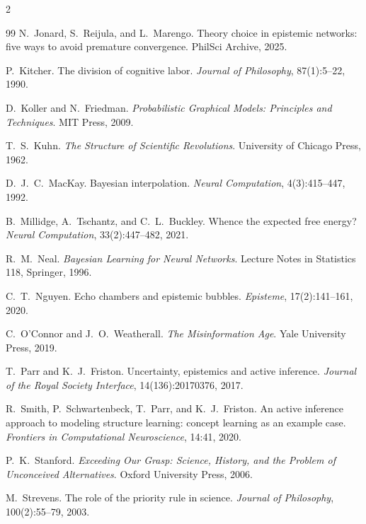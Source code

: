 \documentclass[11pt]{article}
\begin{document}
\begin{multicols}{2}
\begin{thebibliography}{99}
N.~Jonard, S.~Reijula, and L.~Marengo.
Theory choice in epistemic networks: five ways to avoid premature convergence. PhilSci Archive, 2025.

P.~Kitcher.
The division of cognitive labor. \emph{Journal of Philosophy}, 87(1):5--22, 1990.

D.~Koller and N.~Friedman.
\emph{Probabilistic Graphical Models: Principles and Techniques}. MIT Press, 2009.

T.~S.~Kuhn.
\emph{The Structure of Scientific Revolutions}. University of Chicago Press, 1962.

D.~J.~C.~MacKay.
Bayesian interpolation. \emph{Neural Computation}, 4(3):415--447, 1992.

B.~Millidge, A.~Tschantz, and C.~L.~Buckley.
Whence the expected free energy? \emph{Neural Computation}, 33(2):447--482, 2021.

R.~M.~Neal.
\emph{Bayesian Learning for Neural Networks}.
Lecture Notes in Statistics 118, Springer, 1996.

C.~T.~Nguyen.
Echo chambers and epistemic bubbles. \emph{Episteme}, 17(2):141--161, 2020.

C.~O'Connor and J.~O.~Weatherall.
\emph{The Misinformation Age}. Yale University Press, 2019.

T.~Parr and K.~J.~Friston.
Uncertainty, epistemics and active inference.
\emph{Journal of the Royal Society Interface}, 14(136):20170376, 2017.

R.~Smith, P.~Schwartenbeck, T.~Parr, and K.~J.~Friston.
An active inference approach to modeling structure learning: concept learning as an example case.
\emph{Frontiers in Computational Neuroscience}, 14:41, 2020.

P.~K.~Stanford.
\emph{Exceeding Our Grasp: Science, History, and the Problem of Unconceived Alternatives}.
Oxford University Press, 2006.

M.~Strevens.
The role of the priority rule in science. \emph{Journal of Philosophy}, 100(2):55--79, 2003.


\end{thebibliography}
\end{multicols}
\end{document}
